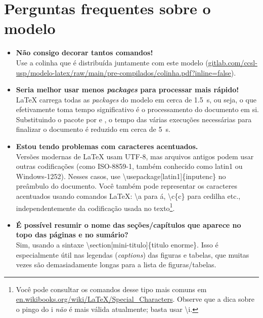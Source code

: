 
\chapter{Perguntas frequentes sobre o modelo}

\begin{itemize}

\item \textbf{Não consigo decorar tantos comandos!}\\
Use a colinha que é distribuída juntamente com este modelo (\url{gitlab.com/ccsl-usp/modelo-latex/raw/main/pre-compilados/colinha.pdf?inline=false}).

\item \textbf{Seria melhor usar menos \textit{packages} para processar mais rápido!}\\
\LaTeX{} carrega todas as \textit{packages} do modelo em cerca de \qty{1.5}{s}, ou seja, o que efetivamente toma tempo significativo é o processamento do documento em si. Substituindo o pacote  por  e , o tempo das várias execuções necessárias para finalizar o documento é reduzido em cerca de \qty{5}{s}.

\item \textbf{Estou tendo problemas com caracteres acentuados.}\\
Versões modernas de \LaTeX{} usam UTF-8, mas arquivos antigos podem usar outras codificações (como ISO-8859-1, também conhecido como latin1 ou Windows-1252). Nesses casos, use \textsf{\textbackslash{}usepackage[latin1]\{inputenc\}} no preâmbulo do documento. Você também pode representar os caracteres acentuados usando comandos \LaTeX{}: \textsf{\textbackslash\textquotesingle{}a} para á, \textsf{\textbackslash{}c\{c\}} para cedilha etc., independentemente da codificação usada no texto\footnote{Você pode consultar os comandos desse tipo mais comuns em \url{en.wikibooks.org/wiki/LaTeX/Special_Characters}. Observe que a dica sobre o pingo do i \emph{não} é mais válida atualmente; basta usar \textsf{\textbackslash\textquotesingle{}i}.}.

\item \textbf{É possível resumir o nome das seções/capítulos que aparece no topo das páginas e no sumário?}\\
Sim, usando a sintaxe \textsf{\textbackslash{}section[mini-titulo]\{titulo enorme\}}. Isso é especialmente útil nas legendas (\textit{captions}) das figuras e tabelas, que muitas vezes são demasiadamente longas para a lista de figuras/tabelas.


\end{itemize}
